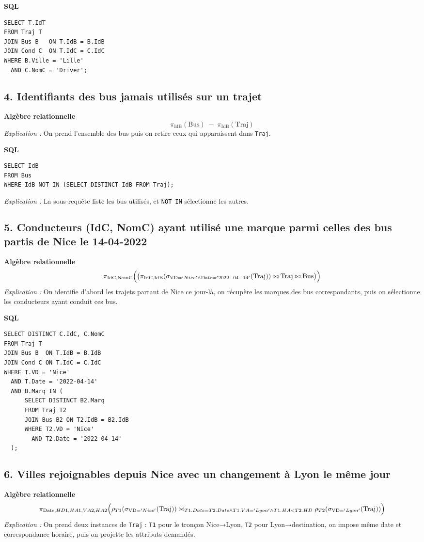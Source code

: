 \documentclass[a4paper,11pt]{article}
\begin{document}
\textbf{SQL}
\begin{verbatim}
SELECT T.IdT
FROM Traj T
JOIN Bus B   ON T.IdB = B.IdB
JOIN Cond C  ON T.IdC = C.IdC
WHERE B.Ville = 'Lille'
  AND C.NomC = 'Driver';
\end{verbatim}

\subsection*{4. Identifiants des bus jamais utilisés sur un trajet}
\textbf{Algèbre relationnelle}\[
  \pi_{\text{IdB}}(\text{Bus})
  \; - \;
  \pi_{\text{IdB}}(\text{Traj})
\]
\textit{Explication :} On prend l'ensemble des bus puis on retire ceux qui apparaissent dans \texttt{Traj}.

\textbf{SQL}
\begin{verbatim}
SELECT IdB
FROM Bus
WHERE IdB NOT IN (SELECT DISTINCT IdB FROM Traj);
\end{verbatim}
\textit{Explication :} La sous-requête liste les bus utilisés, et \texttt{NOT IN} sélectionne les autres.

\subsection*{5. Conducteurs (IdC, NomC) ayant utilisé une marque parmi celles des bus partis de Nice le 14-04-2022}
\textbf{Algèbre relationnelle}
\[
  \pi_{\text{IdC,NomC}}\Bigl(\bigl( \pi_{\text{IdC,IdB}}(\sigma_{\text{VD}='Nice' \land \text{Date}='2022-04-14'}(\text{Traj}))
  \bowtie \text{Traj} \bowtie \text{Bus} \bigr)\Bigr)
\]
\textit{Explication :} On identifie d'abord les trajets partant de Nice ce jour-là, on récupère les marques des bus correspondants, puis on sélectionne les conducteurs ayant conduit ces bus.

\textbf{SQL}
\begin{verbatim}
SELECT DISTINCT C.IdC, C.NomC
FROM Traj T
JOIN Bus B  ON T.IdB = B.IdB
JOIN Cond C ON T.IdC = C.IdC
WHERE T.VD = 'Nice'
  AND T.Date = '2022-04-14'
  AND B.Marq IN (
      SELECT DISTINCT B2.Marq
      FROM Traj T2
      JOIN Bus B2 ON T2.IdB = B2.IdB
      WHERE T2.VD = 'Nice'
        AND T2.Date = '2022-04-14'
  );
\end{verbatim}

\subsection*{6. Villes rejoignables depuis Nice avec un changement à Lyon le même jour}
\textbf{Algèbre relationnelle}\[
  \pi_{\text{Date}, HD1, HA1, VA2, HA2}\Bigl(
    \rho_{T1}(\sigma_{\text{VD}='Nice'}(\text{Traj}))
    \bowtie_{T1.Date=T2.Date \land T1.VA='Lyon' \land T1.HA < T2.HD}
    \rho_{T2}(\sigma_{\text{VD}='Lyon'}(\text{Traj}))
  \Bigr)
\]
\textit{Explication :} On prend deux instances de \texttt{Traj} : \texttt{T1} pour le tronçon Nice→Lyon, \texttt{T2} pour Lyon→destination, on impose même date et correspondance horaire, puis on projette les attributs demandés.
\end{document}
